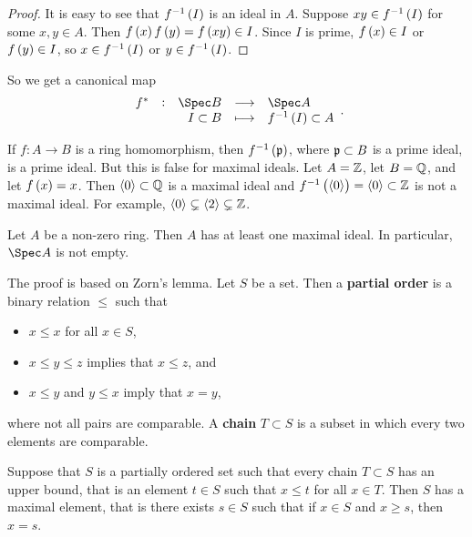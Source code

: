 \begin{proof}
It is easy to see that $ f^{-1}\br{I} $ is an ideal in $ A $. Suppose $ xy \in f^{-1}\br{I} $ for some $ x, y \in A $. Then $ f\br{x}f\br{y} = f\br{xy} \in I $. Since $ I $ is prime, $ f\br{x} \in I $ or $ f\br{y} \in I $, so $ x \in f^{-1}\br{I} $ or $ y \in f^{-1}\br{I} $.
\end{proof}

So we get a canonical map
$$ \function[f^*]{\Spec B}{\Spec A}{I \subset B}{f^{-1}\br{I} \subset A}. $$


\begin{remark}
If $ f : A \to B $ is a ring homomorphism, then $ f^{-1}\br{\ppp} $, where $ \mathfrak{p} \subset B $ is a prime ideal, is a prime ideal. But this is false for maximal ideals. Let $ A = \mathbb{Z} $, let $ B = \mathbb{Q} $, and let $ f\br{x} = x $. Then $ \left\langle 0 \right\rangle \subset \mathbb{Q} $ is a maximal ideal and $ f^{-1}\br{\abr{0}} = \abr{0} \subset \ZZ $ is not a maximal ideal. For example, $ \left\langle 0 \right\rangle \subsetneq \left\langle 2 \right\rangle \subsetneq \mathbb{Z} $.
\end{remark}

\begin{theorem}
\label{thm:4.6}
Let $ A $ be a non-zero ring. Then $ A $ has at least one maximal ideal. In particular, $ \Spec A $ is not empty.
\end{theorem}

The proof is based on Zorn's lemma. Let $ S $ be a set. Then a \textbf{partial order} is a binary relation $ \le $ such that
\begin{itemize}
\item $ x \le x $ for all $ x \in S $,
\item $ x \le y \le z $ implies that $ x \le z $, and
\item $ x \le y $ and $ y \le x $ imply that $ x = y $,
\end{itemize}
where not all pairs are comparable. A \textbf{chain} $ T \subset S $ is a subset in which every two elements are comparable.

\begin{lemma}[Zorn]
Suppose that $ S $ is a partially ordered set such that every chain $ T \subset S $ has an upper bound, that is an element $ t \in S $ such that $ x \le t $ for all $ x \in T $. Then $ S $ has a maximal element, that is there exists $ s \in S $ such that if $ x \in S $ and $ x \ge s $, then $ x = s $.
\end{lemma}

